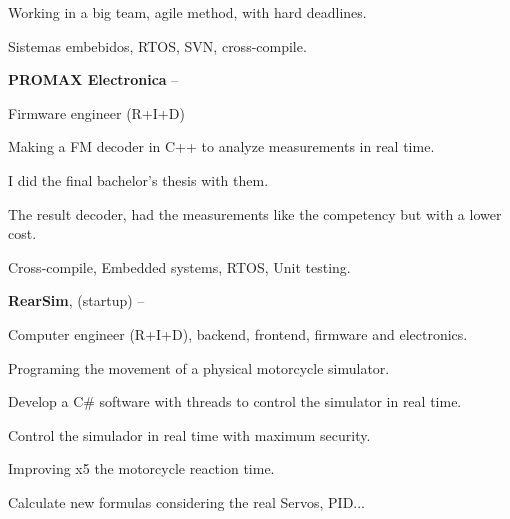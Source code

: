 \documentclass[letterpaper,MMMyyyy,nonstopmode]{simpleresumecv}
\newcommand\tab[1][0.5cm]{\hspace*{#1}}
\begin{document}
\begin{Body}
\tab Working in a big team, agile method, with hard deadlines. 

\tab Sistemas embebidos, RTOS, SVN, cross-compile. 

\Gap


{\textbf{PROMAX Electronica}}
\hfill
{} --

\tab Firmware engineer (R+I+D)

\tab Making a FM decoder in C++ to analyze measurements in real time. 

\tab I did the final bachelor's thesis with them. 

\tab The result decoder, had the measurements like the competency but with a lower cost.

\tab Cross-compile, Embedded systems, RTOS, Unit testing. 

\Gap


{\textbf{RearSim}}, (startup)
\hfill
{} --

\tab Computer engineer (R+I+D), backend, frontend, firmware and electronics. 

\tab Programing the movement of a physical motorcycle simulator. 

\tab Develop a C\# software with threads to control the simulator in real time.

\tab Control the simulador in real time with maximum security.

\tab Improving x5 the motorcycle reaction time. 

\tab Calculate new formulas considering the real Servos, PID...



\end{Body}
\end{document}
